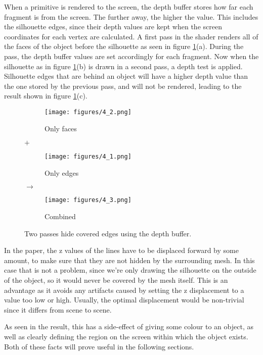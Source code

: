 \documentclass[a4paper, 12pt]{article}
\begin{document}
When a primitive is rendered to the screen, the depth buffer stores how far each fragment is from the screen. The further away, the higher the value. This includes the silhouette edges, since their depth values are kept when the screen coordinates for each vertex are calculated. A first pass in the shader renders all of the faces of the object before the silhouette as seen in figure \ref{cover}(a). During the pass, the depth buffer values are set accordingly for each fragment. Now when the silhouette as in figure \ref{cover}(b) is drawn in a second pass, a depth test is applied. Silhouette edges that are behind an object will have a higher depth value than the one stored by the previous pass, and will not be rendered, leading to the result shown in figure \ref{cover}(c).

\begin{figure}[htbp!]
  \centering
  \begin{subfigure}{0.3\columnwidth}
    \texttt{[image: figures/4\_2.png]}
    \caption{Only faces}
  \end{subfigure}%
  $\bm{+}$%
  \begin{subfigure}{0.3\columnwidth}
    \texttt{[image: figures/4\_1.png]}
    \caption{Only edges}
  \end{subfigure}%
  $\bm{\longrightarrow}$%
  \begin{subfigure}{0.3\columnwidth}
    \texttt{[image: figures/4\_3.png]}
    \caption{Combined}
  \end{subfigure}
  \caption{Two passes hide covered edges using the depth buffer.}
  \label{cover}
\end{figure}


In the paper, the z values of the lines have to be displaced forward by some amount, to make sure that they are not hidden by the surrounding mesh. In this case that is not a problem, since we're only drawing the silhouette on the outside of the object, so it would never be covered by the mesh itself. This is an advantage as it avoids any artifacts caused by setting the z displacement to a value too low or high. Usually, the optimal displacement would be non-trivial since it differs from scene to scene.

As seen in the result, this has a side-effect of giving some colour to an object, as well as clearly defining the region on the screen within which the object exists. Both of these facts will prove useful in the following sections.
\end{document}
